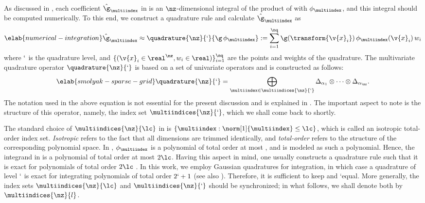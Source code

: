 As discussed in , each coefficient
$\hat{\g}_{\multiindex}$ in  is an
$\nz$-dimensional integral of the product of \g with $\phi_{\multiindex}$, and
this integral should be computed numerically. To this end, we construct a
quadrature rule and calculate $\hat{\g}_{\multiindex}$ as
\begin{equation} \elab{numerical-integration}
  \hat{\g}_{\multiindex} \approx \quadrature{\nz}{\lq}{\g \,
  \phi_{\multiindex}} := \sum_{i = 1}^\nq \g(\transform{\v{x}_i}) \, \phi_{\multiindex}(\v{x}_i) \, w_i
\end{equation}
where $\lq$ is the quadrature level, and $\{ (\v{x}_i \in \real^\nz, w_i \in
\real) \}_{i = 1}^\nq$ are the points and weights of the quadrature. The
multivariate quadrature operator $\quadrature{\nz}{\lq}$ is based on a set of
univariate operators and is constructed as follows:
\begin{equation} \elab{smolyak-sparse-grid}
  \quadrature{\nz}{\lq} = \bigoplus_{\multiindex \in \multiindices{\nz}{\lq}}
  \Delta_{\alpha_1} \otimes \cdots \otimes \Delta_{\alpha_\nz}.
\end{equation}
The notation used in the above equation is not essential for the present
discussion and is explained in . The important
aspect to note is the structure of this operator, namely, the index set
$\multiindices{\nz}{\lq}$, which we shall come back to shortly.

The standard choice of $\multiindices{\nz}{\lc}$ in
 is $\{ \multiindex: \norm[1]{\multiindex} \leq \lc
\}$, which is called an isotropic total-order index set. \emph{Isotropic} refers
to the fact that all dimensions are trimmed identically, and \emph{total-order}
refers to the structure of the corresponding polynomial space. In
, $\phi_{\multiindex}$ is a polynomial of total
order at most \lc, and \g is modeled as such a polynomial. Hence, the integrand
in  is a polynomial of total order at most $2 \lc$.
Having this aspect in mind, one usually constructs a quadrature rule such that
it is exact for polynomials of total order $2 \lc$ \cite{eldred2008}. In this
work, we employ Gaussian quadratures for integration, in which case a quadrature
of level $\lq$ is exact for integrating polynomials of total order $2 \lq + 1$
\cite{heiss2008} (see also ). Therefore, it is
sufficient to keep \lc and \lq equal. More generally, the index sets
$\multiindices{\nz}{\lc}$ and $\multiindices{\nz}{\lq}$ should be synchronized;
in what follows, we shall denote both by $\multiindices{\nz}{l}$.

